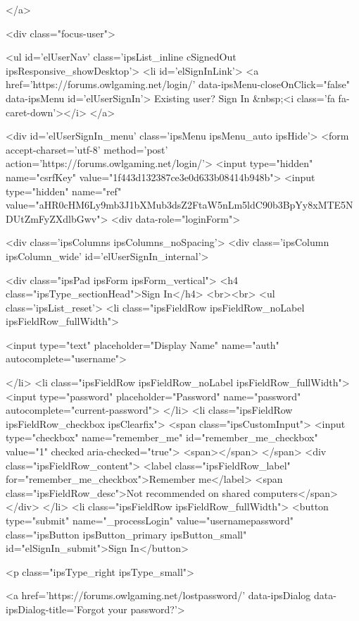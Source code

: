 	
</a>
									
										<div class="focus-user">

	<ul id='elUserNav' class='ipsList_inline cSignedOut ipsResponsive_showDesktop'>
		<li id='elSignInLink'>
			<a href='https://forums.owlgaming.net/login/' data-ipsMenu-closeOnClick="false" data-ipsMenu id='elUserSignIn'>
				Existing user? Sign In &nbsp;<i class='fa fa-caret-down'></i>
			</a>
			
<div id='elUserSignIn_menu' class='ipsMenu ipsMenu_auto ipsHide'>
	<form accept-charset='utf-8' method='post' action='https://forums.owlgaming.net/login/'>
		<input type="hidden" name="csrfKey" value="1f443d132387ce3e0d633b08414b948b">
		<input type="hidden" name="ref" value="aHR0cHM6Ly9mb3J1bXMub3dsZ2FtaW5nLm5ldC90b3BpYy8xMTE5NDUtZmFyZXdlbGwv">
		<div data-role="loginForm">
			
			
			
				<div class='ipsColumns ipsColumns_noSpacing'>
					<div class='ipsColumn ipsColumn_wide' id='elUserSignIn_internal'>
						
<div class="ipsPad ipsForm ipsForm_vertical">
	<h4 class="ipsType_sectionHead">Sign In</h4>
	<br><br>
	<ul class='ipsList_reset'>
		<li class="ipsFieldRow ipsFieldRow_noLabel ipsFieldRow_fullWidth">
			
			
				<input type="text" placeholder="Display Name" name="auth" autocomplete="username">
			
		</li>
		<li class="ipsFieldRow ipsFieldRow_noLabel ipsFieldRow_fullWidth">
			<input type="password" placeholder="Password" name="password" autocomplete="current-password">
		</li>
		<li class="ipsFieldRow ipsFieldRow_checkbox ipsClearfix">
			<span class="ipsCustomInput">
				<input type="checkbox" name="remember_me" id="remember_me_checkbox" value="1" checked aria-checked="true">
				<span></span>
			</span>
			<div class="ipsFieldRow_content">
				<label class="ipsFieldRow_label" for="remember_me_checkbox">Remember me</label>
				<span class="ipsFieldRow_desc">Not recommended on shared computers</span>
			</div>
		</li>
		<li class="ipsFieldRow ipsFieldRow_fullWidth">
			<button type="submit" name="_processLogin" value="usernamepassword" class="ipsButton ipsButton_primary ipsButton_small" id="elSignIn_submit">Sign In</button>
			
				<p class="ipsType_right ipsType_small">
					
						<a href='https://forums.owlgaming.net/lostpassword/' data-ipsDialog data-ipsDialog-title='Forgot your password?'>
					
